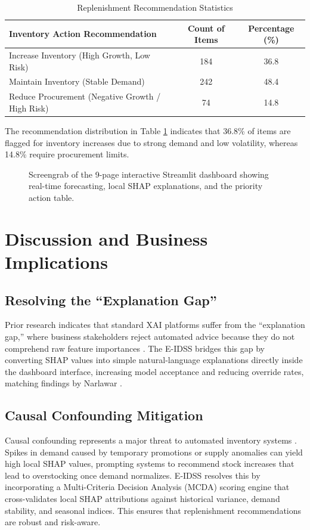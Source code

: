 \documentclass[conference]{IEEEtran}
\begin{document}
\begin{table}[htbp]
\caption{Replenishment Recommendation Statistics}
\label{tab:rec_stats}
\centering
\begin{tabular}{lcc}
\toprule
\textbf{Inventory Action Recommendation} & \textbf{Count of Items} & \textbf{Percentage (\%)} \\
\midrule
Increase Inventory (High Growth, Low Risk) & 184 & 36.8 \\
Maintain Inventory (Stable Demand) & 242 & 48.4 \\
Reduce Procurement (Negative Growth / High Risk) & 74 & 14.8 \\
\bottomrule
\end{tabular}
\end{table}

The recommendation distribution in Table \ref{tab:rec_stats} indicates that 36.8\% of items are flagged for inventory increases due to strong demand and low volatility, whereas 14.8\% require procurement limits.

\begin{figure}[htbp]
\centering
{}
\caption{Screengrab of the 9-page interactive Streamlit dashboard showing real-time forecasting, local SHAP explanations, and the priority action table.}
\label{fig:dashboard_screenshot}
\end{figure}

\section{Discussion and Business Implications}

\subsection{Resolving the ``Explanation Gap''}
Prior research indicates that standard XAI platforms suffer from the ``explanation gap,'' where business stakeholders reject automated advice because they do not comprehend raw feature importances \cite{narlawar2025explainable}. The E-IDSS bridges this gap by converting SHAP values into simple natural-language explanations directly inside the dashboard interface, increasing model acceptance and reducing override rates, matching findings by Narlawar \cite{narlawar2025explainable}.

\subsection{Causal Confounding Mitigation}
Causal confounding represents a major threat to automated inventory systems \cite{gupta2025causal}. Spikes in demand caused by temporary promotions or supply anomalies can yield high local SHAP values, prompting systems to recommend stock increases that lead to overstocking once demand normalizes. E-IDSS resolves this by incorporating a Multi-Criteria Decision Analysis (MCDA) scoring engine that cross-validates local SHAP attributions against historical variance, demand stability, and seasonal indices. This ensures that replenishment recommendations are robust and risk-aware.
\end{document}
